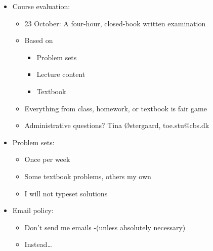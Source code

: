 \documentclass[ignorenonframetext,]{beamer}
\begin{document}
\begin{frame}

\begin{itemize}
\itemsep1pt\parskip0pt
\item
  Course evaluation:

  \begin{itemize}
  \itemsep1pt\parskip0pt
  \item
    23 October: A four-hour, closed-book written examination
  \item
    Based on

    \begin{itemize}
    \itemsep1pt\parskip0pt
    \item
      Problem sets
    \item
      Lecture content
    \item
      Textbook
    \end{itemize}
  \item
    Everything from class, homework, or textbook is fair game
  \item
    Administrative questions? Tina Østergaard, toe.stu@cbs.dk
  \end{itemize}
\end{itemize}

\end{frame}

\begin{frame}

\begin{itemize}
\itemsep1pt\parskip0pt
\item
  Problem sets:

  \begin{itemize}
  \itemsep1pt\parskip0pt
  \item
    Once per week
  \item
    Some textbook problems, others my own
  \item
    I will not typeset solutions
  \end{itemize}
\end{itemize}

\end{frame}

\begin{frame}

\begin{itemize}
\itemsep1pt\parskip0pt
\item
  Email policy:

  \begin{itemize}
  \itemsep1pt\parskip0pt
  \item
    Don't send me emails -(unless absolutely necessary)
  \item
    Instead\ldots
  \end{itemize}
\end{itemize}

\end{frame}
\end{document}
